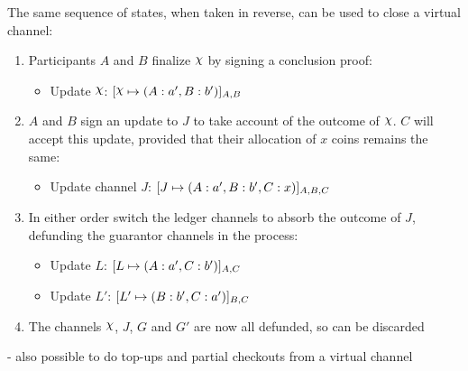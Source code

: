 \documentclass{article}
\begin{document}
The same sequence of states, when taken in reverse, can be used to close a virtual channel:
\begin{enumerate}
  \item Participants $A$ and $B$ finalize $\rchi$ by signing a conclusion proof:
  \begin{itemize}
    \item Update $\rchi$: $\finalizable{\rchi}{\alloc{A:a', B:b'}}{A,B}$
  \end{itemize}
  \item $A$ and $B$ sign an update to $J$ to take account of the outcome of $\rchi$. $C$ will accept this update, provided that their allocation of $x$ coins remains the same:
  \begin{itemize}
    \item Update channel $J$: $[J \mapsto ( A: a', B:b', C: x )]_{A, B, C}$
  \end{itemize}
  \item In either order switch the ledger channels to absorb the outcome of $J$, defunding the guarantor channels in the process:
  \begin{itemize}
    \item Update $L$: $[L \mapsto ( A: a', C: b' )]_{A,C}$
    \item Update $L'$: $[L' \mapsto ( B: b', C: a' )]_{B,C}$
  \end{itemize}
  \item The channels $\rchi$, $J$, $G$ and $G'$ are now all defunded, so can be discarded
\end{enumerate}

- also possible to do top-ups and partial checkouts from a virtual channel
\end{document}
